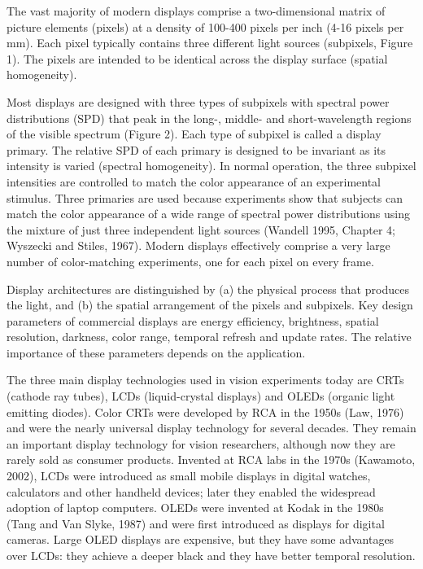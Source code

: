 \documentclass[
  letterpaper,
]{book}
\begin{document}
The vast majority of modern displays comprise a two-dimensional matrix
of picture elements (pixels) at a density of 100-400 pixels per inch
(4-16 pixels per mm). Each pixel typically contains three different
light sources (subpixels, Figure 1). The pixels are intended to be
identical across the display surface (spatial homogeneity).

Most displays are designed with three types of subpixels with spectral
power distributions (SPD) that peak in the long-, middle- and
short-wavelength regions of the visible spectrum (Figure 2). Each type
of subpixel is called a display primary. The relative SPD of each
primary is designed to be invariant as its intensity is varied (spectral
homogeneity). In normal operation, the three subpixel intensities are
controlled to match the color appearance of an experimental stimulus.
Three primaries are used because experiments show that subjects can
match the color appearance of a wide range of spectral power
distributions using the mixture of just three independent light sources
(Wandell 1995, Chapter 4; Wyszecki and Stiles, 1967). Modern displays
effectively comprise a very large number of color-matching experiments,
one for each pixel on every frame.

Display architectures are distinguished by (a) the physical process that
produces the light, and (b) the spatial arrangement of the pixels and
subpixels. Key design parameters of commercial displays are energy
efficiency, brightness, spatial resolution, darkness, color range,
temporal refresh and update rates. The relative importance of these
parameters depends on the application.

The three main display technologies used in vision experiments today are
CRTs (cathode ray tubes), LCDs (liquid-crystal displays) and OLEDs
(organic light emitting diodes). Color CRTs were developed by RCA in the
1950s (Law, 1976) and were the nearly universal display technology for
several decades. They remain an important display technology for vision
researchers, although now they are rarely sold as consumer products.
Invented at RCA labs in the 1970s (Kawamoto, 2002), LCDs were introduced
as small mobile displays in digital watches, calculators and other
handheld devices; later they enabled the widespread adoption of laptop
computers. OLEDs were invented at Kodak in the 1980s (Tang and Van
Slyke, 1987) and were first introduced as displays for digital cameras.
Large OLED displays are expensive, but they have some advantages over
LCDs: they achieve a deeper black and they have better temporal
resolution.
\end{document}
